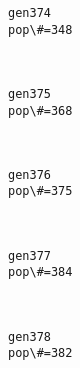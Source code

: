 \documentclass[11pt]{article}
\begin{document}
    \begin{Verbatim}[commandchars=\\\{\}]
gen374
pop\#=348

    \end{Verbatim}

    \begin{center}
    \end{center}
    { \hspace*{\fill} \\}
    
    \begin{Verbatim}[commandchars=\\\{\}]
gen375
pop\#=368

    \end{Verbatim}

    \begin{center}
    \end{center}
    { \hspace*{\fill} \\}
    
    \begin{Verbatim}[commandchars=\\\{\}]
gen376
pop\#=375

    \end{Verbatim}

    \begin{center}
    \end{center}
    { \hspace*{\fill} \\}
    
    \begin{Verbatim}[commandchars=\\\{\}]
gen377
pop\#=384

    \end{Verbatim}

    \begin{center}
    \end{center}
    { \hspace*{\fill} \\}
    
    \begin{Verbatim}[commandchars=\\\{\}]
gen378
pop\#=382

    \end{Verbatim}
\end{document}
